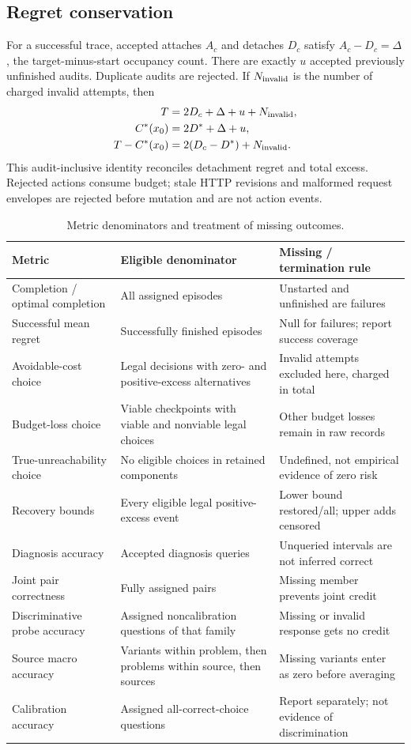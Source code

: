 \subsection{Regret conservation}
For a successful trace, accepted attaches $A_c$ and detaches $D_c$
satisfy $A_c-D_c=\Delta$, the target-minus-start occupancy count.
There are exactly $u$ accepted previously unfinished audits.
Duplicate audits are rejected. If $N_{\rm invalid}$ is the number of
charged invalid attempts, then
\begin{align}
T &=2D_c+\Delta+u+N_{\rm invalid},\\
C^*(x_0)&=2D^*+\Delta+u,\\
T-C^*(x_0)&=2(D_c-D^*)+N_{\rm invalid}.
\end{align}
This audit-inclusive identity reconciles detachment regret and total
excess. Rejected actions consume budget; stale HTTP revisions and malformed
request envelopes are rejected before mutation and are not action events.

\begin{table}[t]
\centering\small
\caption{Metric denominators and treatment of missing outcomes.}
\begin{tabular}{p{}p{}p{}}\toprule
Metric & Eligible denominator & Missing / termination rule\\\midrule
Completion / optimal completion & All assigned episodes & Unstarted and unfinished are failures\\
Successful mean regret & Successfully finished episodes & Null for failures; report success coverage\\
Avoidable-cost choice & Legal decisions with zero- and positive-excess alternatives & Invalid attempts excluded here, charged in total\\
Budget-loss choice & Viable checkpoints with viable and nonviable legal choices & Other budget losses remain in raw records\\
True-unreachability choice & No eligible choices in retained components & Undefined, not empirical evidence of zero risk\\
Recovery bounds & Every eligible legal positive-excess event & Lower bound restored/all; upper adds censored\\
Diagnosis accuracy & Accepted diagnosis queries & Unqueried intervals are not inferred correct\\
Joint pair correctness & Fully assigned pairs & Missing member prevents joint credit\\
Discriminative probe accuracy & Assigned noncalibration questions of that family & Missing or invalid response gets no credit\\
Source macro accuracy & Variants within problem, then problems within source, then sources & Missing variants enter as zero before averaging\\
Calibration accuracy & Assigned all-correct-choice questions & Report separately; not evidence of discrimination\\
\bottomrule\end{tabular}
\end{table}

